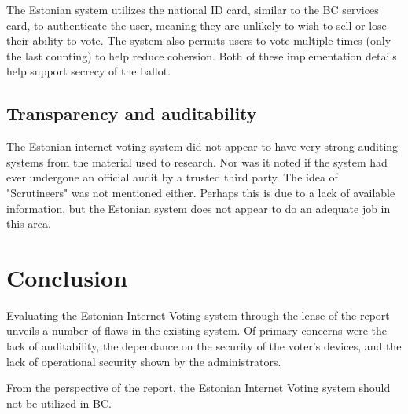\documentclass[a4paper, 11pt]{article} %
\begin{document}
The Estonian system utilizes the national ID card, similar to the BC services card, to authenticate the user, meaning they are unlikely to wish to sell or lose their ability to vote. The system also permits users to vote multiple times (only the last counting) to help reduce cohersion. Both of these implementation details help support secrecy of the ballot.

\subsection*{Transparency and auditability}

The Estonian internet voting system did not appear to have very strong auditing systems from the material used to research. Nor was it noted if the system had ever undergone an official audit by a trusted third party. The idea of "Scrutineers" was not mentioned either. Perhaps this is due to a lack of available information, but the Estonian system does not appear to do an adequate job in this area.

\section*{Conclusion}

Evaluating the Estonian Internet Voting system through the lense of the report \cite{internet-voting-report} unveils a number of flaws in the existing system. Of primary concerns were the lack of auditability, the dependance on the security of the voter's devices, and the lack of operational security shown by the administrators.

From the perspective of the report, the Estonian Internet Voting system should not be utilized in BC.







\end{document}
